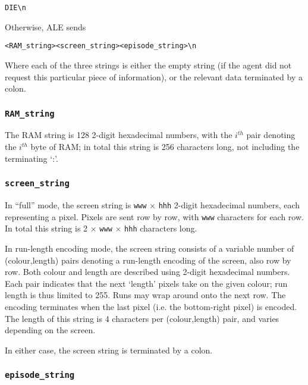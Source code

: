 \documentclass[12pt]{article}
\begin{document}
\begin{verbatim}
DIE\n
\end{verbatim}

Otherwise, ALE sends

\begin{verbatim}
<RAM_string><screen_string><episode_string>\n
\end{verbatim}

Where each of the three strings is either the empty string (if the agent did not request this
particular piece of information), or the relevant data terminated by a colon.

\subsubsection{\texttt{RAM\_string}}

The RAM string is 128 2-digit hexadecimal numbers, with the $i^{th}$ pair denoting the
$i^{th}$ byte of RAM; in total this string is 256 characters long, not including the terminating
`:'.

\subsubsection{\texttt{screen\_string}}

In ``full'' mode, the screen string is \texttt{www} $\times$ \texttt{hhh} 2-digit hexadecimal numbers, each representing a pixel. Pixels are sent row by row, with \texttt{www} characters for each row. In total this string is 2 $\times$ \texttt{www} $\times$ \texttt{hhh} characters long.

In run-length encoding mode, the screen string consists of a variable number of (colour,length) pairs denoting a run-length encoding of the screen, also row by row. Both colour and length are described using 2-digit hexadecimal numbers. Each pair indicates that the next `length' pixels take on the given colour; run length is thus limited to 255. Runs may wrap around onto the next row. The encoding terminates when the last pixel (i.e. the bottom-right pixel) is encoded. The length of this string is 4 characters per (colour,length) pair, and varies depending on the screen.

In either case, the screen string is terminated by a colon.

\subsubsection{\texttt{episode\_string}}
\end{document}
